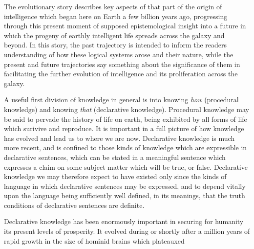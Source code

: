The evolutionary story describes key aspects of that part of the origin of intelligence which began here on Earth a few billion years ago, progressing through this present moment of supposed epistemological insight into a future in which the progeny of earthly intelligent life spreads across the galaxy and beyond.
In this story, the past trajectory is intended to inform the readers understanding of how these logical systems arose and their nature, while the present and future trajectories say something about the significance of them in facilitating the further evolution of intelligence and its proliferation across the galaxy.

A useful first division of knowledge in general is into knowing \emph{how} (procedural knowledge) and knowing \emph{that} (declarative knowledge).
Procedural knowledge may be said to pervade the history of life on earth, being exhibited by all forms of life which surivive and reproduce.
It is important in a full picture of how knowledge has evolved and lead us to where we are now.
Declarative knowledge is much more recent, and is confined to those kinds of knowledge which are expressible in declarative sentences, which can be stated in a meaningful sentence which expresses a claim on some subject matter which will be true, or false.
Declarative knowledge we may therefore expect to have existed only since the kinds of language in which declarative sentences may be expressed, and to depend vitally upon the language being sufficiently well defined, in its meanings, that the truth conditions of declarative sentences are definite.

Declarative knowledge has been enormously important in securing for humanity its present levels of prosperity.
It evolved during or shortly after a million years of rapid growth in the size of hominid brains which plateauxed
